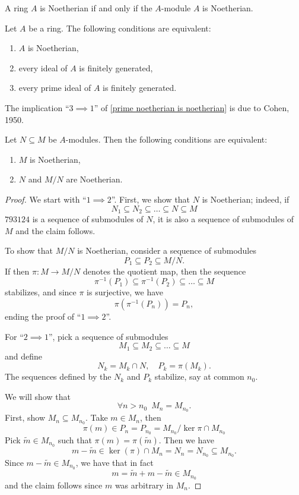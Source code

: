 \begin{df}
  A ring $A$ is Noetherian if and only if the $A$-module $A$ is Noetherian. 
\end{df}

\begin{prop}
  \label{prime noetherian is noetherian}
  Let $A$ be a ring. The following conditions are equivalent:
  \begin{enumerate}
  \item $A$ is Noetherian,
  \item every ideal of $A$ is finitely generated,
  \item every prime ideal of $A$ is finitely generated.
  \end{enumerate}
  \hfill\blacksquare
\end{prop}

The implication ``$3 \implies 1$'' of \cref{prime noetherian is noetherian} is due to Cohen, 1950.

\begin{prop}
  \label{noetherian-extensions}
  Let $N \subseteq M$ be $A$-modules. Then the following conditions are equivalent:
  \begin{enumerate}
  \item $M$ is Noetherian,
  \item $N$ and $M/{N}$ are Noetherian.
  \end{enumerate}
\end{prop}
\begin{proof}
  We start with ``$1 \implies 2$''. First, we show that $N$ is Noetherian; indeed, if
  \[ N_1 \subseteq N_2 \subseteq \ldots \subseteq N \subseteq M\]
  \(793124\)
  is a sequence of submodules of $N$, it is also a sequence of submodules of $M$ and the claim follows.

  To show that $M /{N}$ is Noetherian, consider a sequence of submodules
  \[ P_1 \subseteq P_2 \subseteq M /{N}.\]
  If then $\pi \colon M \to M /{N}$ denotes the quotient map, then the sequence
  \[ \pi^{-1}(P_1) \subseteq \pi^{-1}(P_2) \subseteq \ldots \subseteq M\]
  stabilizes, and since $\pi$ is surjective, we have
  \[ \pi(\pi^{-1}(P_n)) = P_n,\]
  ending the proof of ``$1 \implies 2$''.

  For ``$2 \implies 1$'', pick a sequence of submodules
  \[M_1 \subseteq M_2 \subseteq \ldots \subseteq M\]
  and define
  \[ N_k = M_k \cap N, \quad P_k = \pi(M_k).\]
  The sequences defined by the $N_k$ and $P_k$ stabilize, say at common $n_0$.

  We will show that
  \[ \forall n > n_0 \enspace M_n = M_{n_0}.\]
  First, show $M_n \subseteq M_{n_0}$. Take $m \in M_n$, then
  \[ \pi(m) \in P_n = P_{n_0} = M_{n_0} / {\ker \pi \cap M_{n_0}}\]
  Pick $\tilde m \in M_{n_0}$ such that $\pi(m) = \pi(\tilde m)$.
  Then we have
  \[ m - \tilde{m} \in \ker(\pi) \cap M_n = N_n = N_{n_0} \subseteq M_{n_0}.\]
  Since $m-\tilde{m} \in M_{n_0}$, we have that
  in fact
  \[ m = \tilde{m} + m - \tilde{m} \in M_{n_0}\]
  and the claim follows since $m$ was arbitrary in $M_n$.
\end{proof}


